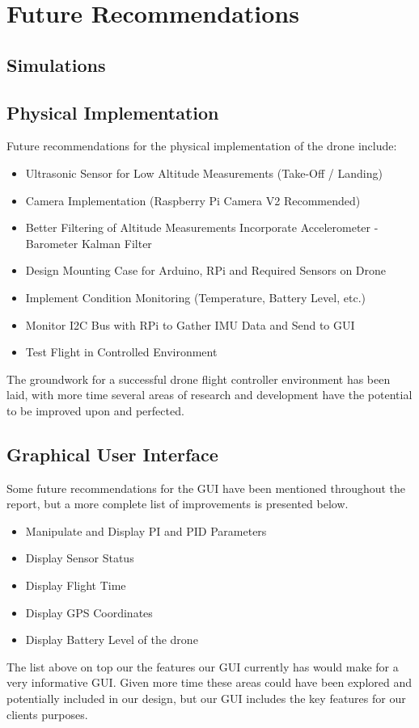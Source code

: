 \section{Future Recommendations}
\subsection{Simulations}


\subsection{Physical Implementation}

Future recommendations for the physical implementation of the drone include:

\begin{itemize}
\item Ultrasonic Sensor for Low Altitude Measurements (Take-Off / Landing)
\item Camera Implementation (Raspberry Pi Camera V2 Recommended)
\item Better Filtering of Altitude Measurements Incorporate Accelerometer - Barometer Kalman Filter
\item Design Mounting Case for Arduino, RPi and Required Sensors on Drone
\item Implement Condition Monitoring (Temperature, Battery Level, etc.)
\item Monitor I2C Bus with RPi to Gather IMU Data and Send to GUI
\item Test Flight in Controlled Environment
\end{itemize}

The groundwork for a successful drone flight controller environment has been laid, with more time several areas of research and development have the potential to be improved upon and perfected.


\subsection{Graphical User Interface}
Some future recommendations for the GUI have been mentioned throughout the report, but a more complete list of improvements is presented below. 

\begin{itemize}
	\item Manipulate and Display PI and PID Parameters
	\item Display Sensor Status
	\item Display Flight Time
	\item Display GPS Coordinates
	\item Display Battery Level of the drone
\end{itemize}

The list above on top our the features our GUI currently has would make for a very informative GUI. Given more time these areas could have been explored and potentially included in our design, but our GUI includes the key features for our clients purposes.
